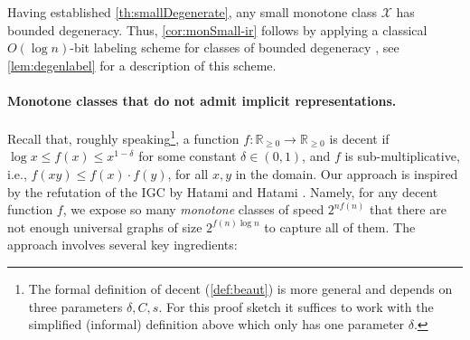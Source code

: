 \documentclass[letterpaper,11pt]{article}
\newcommand{\Smull}{sub-multiplicative\xspace}
\newcommand{\Rrr}{\mathbb{R}_{\geq 0}}
\theoremstyle{definition}
\theoremstyle{remark}
\renewcommand{\leq}{\leqslant}
\renewcommand{\geq}{\geqslant}
\begin{document}
Having established \cref{th:smallDegenerate}, any small monotone class $\mathcal{X}$ has bounded degeneracy. Thus, \cref{cor:monSmall-ir} follows by applying a classical $O(\log n)$-bit labeling scheme for classes of bounded degeneracy \cite{KNR92}, see \cref{lem:degenlabel} for a description of this scheme.  
	\paragraph{Monotone classes that do not admit implicit representations.}
Recall that, roughly speaking\footnote{The formal definition of decent (\cref{def:beaut}) is more general and depends on three parameters $\delta, C,s$. For this proof sketch it suffices to work with the simplified (informal) definition above which only has one parameter $\delta$.}, a function $f : \Rrr \rightarrow \Rrr$ is decent if $\log x \leq f(x) \leq x^{1-\delta}$ for some constant $\delta\in(0,1)$, and $f$ is \Smull, i.e., $f(xy)\leq f(x)\cdot f(y)$, for all $x,y$ in the domain. 	Our approach is inspired by the refutation of the IGC by Hatami and Hatami \cite{HH22}. Namely, for any decent function  $f$, we expose so many \emph{monotone} classes of speed $2^{n f(n)}$ that there are not enough universal graphs of size $2^{f(n) \log n}$ to capture all of them.
	The approach involves several key ingredients:
\end{document}
